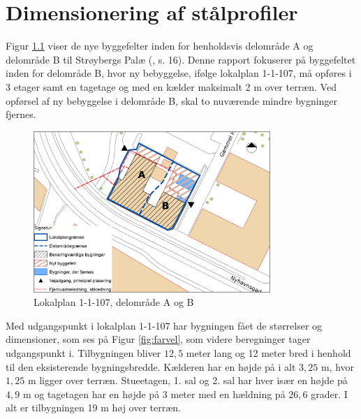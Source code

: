 \chapter{Dimensionering af stålprofiler}

Figur \ref{fig:hej} viser de nye byggefelter inden for henholdsvis delområde A og delområde B til Strøybergs Palæ (\citep{lokalplan}, s. 16). Denne rapport fokuserer på byggefeltet inden for delområde B, hvor ny bebyggelse, ifølge lokalplan 1-1-107, må opføres i 3 etager samt en tagetage og med en kælder maksimalt 2 m over terræn. Ved opførsel af ny bebyggelse i delområde B, skal to nuværende mindre bygninger fjernes. 

\begin{figure}[htbp]
	\centering
	\includegraphics[width=0.8\textwidth]{billeder/signatur.png}
	\caption{Lokalplan 1-1-107, delområde A og B \citep[ bilag 2, s. 35]{lokalplan}}
	\label{fig:hej}
\end{figure}

Med udgangspunkt i lokalplan 1-1-107 har bygningen fået de størrelser og dimensioner, som ses på Figur \ref{fig:farvel}, som videre beregninger tager udgangspunkt i.
\newline \indent{     }  Tilbygningen bliver $12,\!5$ meter lang og 12 meter bred i henhold til den eksisterende bygningsbredde. Kælderen har en højde på i alt $3,\!25$ m, hvor $1,\!25$ m ligger over terræn. Stueetagen, 1. sal og 2. sal har hver især en højde på $4,\!9$ m og tagetagen har en højde på 3 meter med en hældning på $26,\!6$ grader. I alt er tilbygningen 19 m høj over terræn.

